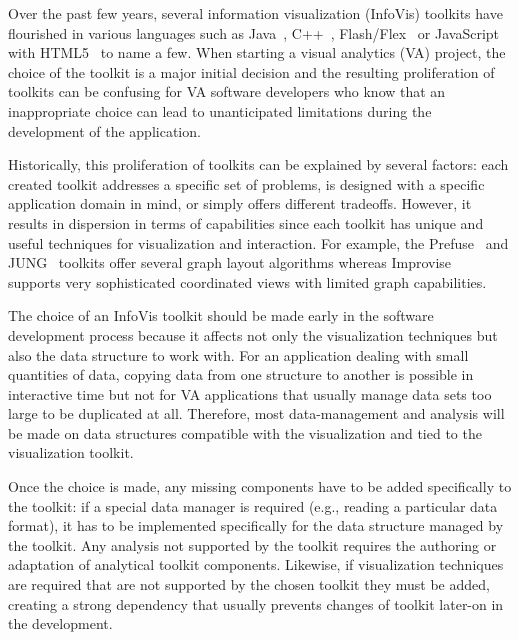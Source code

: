 
Over the past few years, several information visualization (InfoVis)
toolkits have flourished in various languages such as
Java~\cite{Discovery2,InfoVis, Prefuse, jung2003, Improvise},
C++~\cite{Tulip,ADVIZOR}, Flash/Flex~\cite{Axiis,flare} or
JavaScript with HTML5~\cite{thejit,Protovis} to name a few.  When starting
a visual analytics (VA) project, the choice of the toolkit is a major
initial decision and the resulting proliferation of toolkits can be confusing
for VA software developers who know that an
inappropriate choice can lead to unanticipated limitations during the
development of the application.

Historically, this proliferation of toolkits can be explained by
several factors: each created toolkit addresses a specific set of
problems, is designed with a specific application domain in mind, or
simply offers different tradeoffs.  However, it results in dispersion
in terms of capabilities since each toolkit has unique and useful
techniques for visualization and interaction.  For example, the
Prefuse~\cite{Prefuse} and JUNG~\cite{jung2003} toolkits offer several
graph layout algorithms whereas Improvise~\cite{Improvise} supports
very sophisticated coordinated views with limited graph capabilities.

The choice of an InfoVis toolkit should be made
early in the software development process because it affects not only the visualization techniques but
also the data structure to work with.  For an application dealing with
small quantities of data, copying data from one structure to another
is possible in interactive time but not for VA
applications that usually manage data sets too large to be duplicated
at all.  Therefore, most data-management and analysis will be made on
data structures compatible with the visualization and tied to the
visualization toolkit.


Once the choice is made, any missing components have to be added
specifically to the toolkit: if a special data manager is required
(e.g., reading a particular data format), it has to be implemented
specifically for the data structure managed by the toolkit. Any analysis
not supported by the toolkit requires the authoring or adaptation of
analytical toolkit components. Likewise, if visualization techniques
are required that are not supported by the chosen toolkit they must
be added, creating a strong dependency that usually prevents changes
of toolkit later-on in the development.

